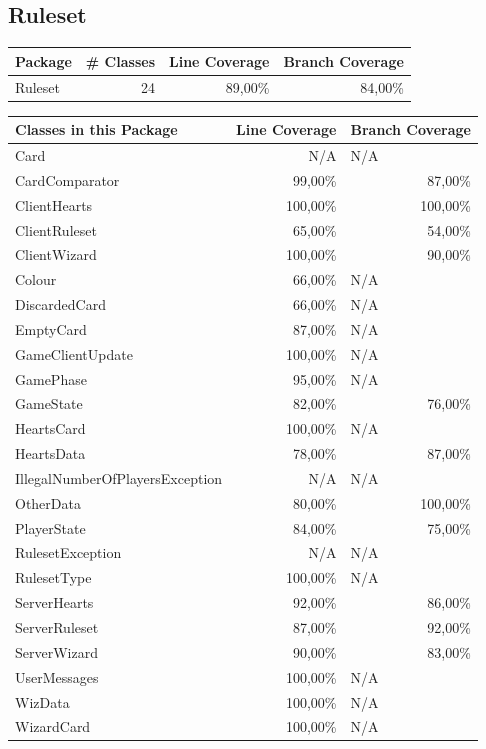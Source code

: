 \documentclass[a4paper]{article}
\begin{document}
 	
	\subsection{Ruleset}
	
\noindent	
\begin{tabular}{|l|l|l|l|}
\hline
Package & \# Classes & Line Coverage & Branch Coverage \\ \hline \hline
Ruleset & \multicolumn{1}{r|}{24} & \multicolumn{1}{r|}{89,00\%} & \multicolumn{1}{r|}{84,00\%} \\ \hline
\end{tabular}

\noindent
\begin{tabular}{|l|r|l|}
\hline
Classes in this Package & \multicolumn{1}{l|}{Line Coverage} & Branch Coverage \\ \hline \hline
Card & N/A & N/A \\ \hline 
CardComparator & 99,00\% & \multicolumn{1}{r|}{87,00\%} \\ \hline
ClientHearts & 100,00\% & \multicolumn{1}{r|}{100,00\%} \\ \hline
ClientRuleset & 65,00\% & \multicolumn{1}{r|}{54,00\%} \\ \hline
ClientWizard & 100,00\% & \multicolumn{1}{r|}{90,00\%} \\ \hline
Colour & 66,00\% & N/A \\ \hline
DiscardedCard & 66,00\% & N/A \\ \hline
EmptyCard & 87,00\% & N/A \\ \hline
GameClientUpdate & 100,00\% & N/A \\ \hline
GamePhase & 95,00\% & N/A \\ \hline
GameState & 82,00\% & \multicolumn{1}{r|}{76,00\%} \\ \hline
HeartsCard & 100,00\% & N/A \\ \hline
HeartsData & 78,00\% & \multicolumn{1}{r|}{87,00\%} \\ \hline
IllegalNumberOfPlayersException & N/A & N/A \\ \hline
OtherData & 80,00\% & \multicolumn{1}{r|}{100,00\%} \\ \hline
PlayerState & 84,00\% & \multicolumn{1}{r|}{75,00\%} \\ \hline
RulesetException & N/A & N/A \\ \hline
RulesetType & 100,00\% & N/A \\ \hline
ServerHearts & 92,00\% & \multicolumn{1}{r|}{86,00\%} \\ \hline
ServerRuleset & 87,00\% & \multicolumn{1}{r|}{92,00\%} \\ \hline
ServerWizard & 90,00\% & \multicolumn{1}{r|}{83,00\%} \\ \hline
UserMessages & 100,00\% & N/A \\ \hline
WizData & 100,00\% & N/A \\ \hline
WizardCard & 100,00\% & N/A \\ \hline
\end{tabular}
\end{document}
